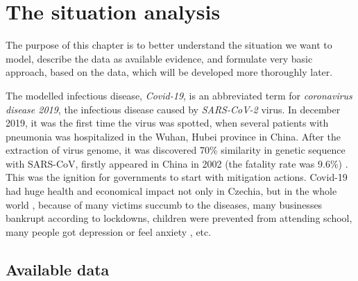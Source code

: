 \documentclass[
  digital, %
  oneside, %
  lof,     %
  lot,     %
]{fithesis4}
\begin{document}



\chapter{The situation analysis}

The purpose of this chapter is to better understand the situation 
we want to model, describe the data as available evidence, and
formulate very basic approach, based on the data, which will be 
developed more thoroughly later.

The modelled infectious disease, \textit{Covid-19}, is an abbreviated 
term for \textit{coronavirus disease 2019}, the infectious disease 
caused by \textit{SARS-CoV-2} virus. 
In december 2019, it was the first time the virus was spotted, 
when several patients with pneumonia was hospitalized in the 
Wuhan, Hubei province in China. 
After the extraction of virus genome, it was discovered 
70\% similarity in genetic sequence with SARS-CoV, 
firstly appeared in China in 2002 (the fatality rate 
was 9.6\%) \cite{hui2019}.
This was the ignition for governments to start with mitigation 
actions.
Covid-19 had huge health and economical impact not only in 
Czechia, but in the whole world \cite{maital2020}, because of many victims
succumb to the diseases, many businesses bankrupt according
to lockdowns, children were prevented from attending
school, many people got depression or feel anxiety \cite{khan2020}, etc.


\section{Available data}
\label{sec:available-data}
\end{document}
